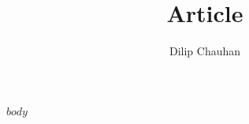\documentclass[12pt]{article}
\author{Dilip Chauhan}
\title{Article}
\begin{document}
\maketitle
$body$
\end{document}
